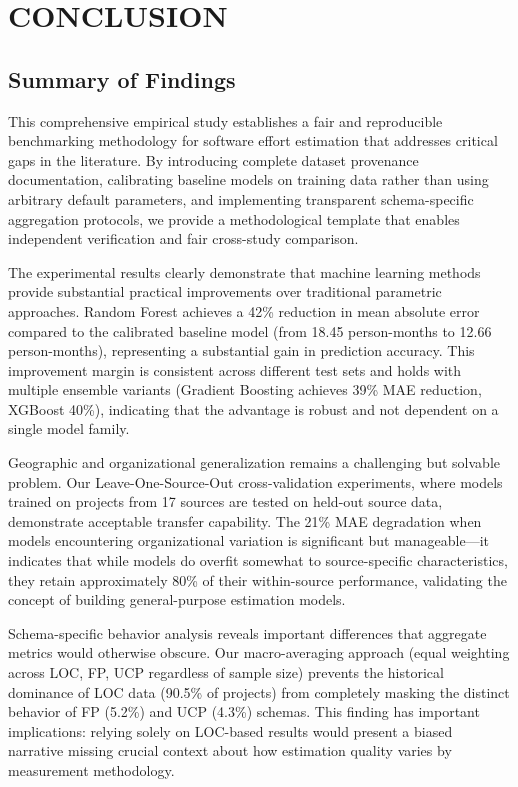 \documentclass[11pt,a4paper]{article}
\begin{document}
\newpage

\section{CONCLUSION}

\subsection{Summary of Findings}

This comprehensive empirical study establishes a fair and reproducible benchmarking methodology for software effort estimation that addresses critical gaps in the literature. By introducing complete dataset provenance documentation, calibrating baseline models on training data rather than using arbitrary default parameters, and implementing transparent schema-specific aggregation protocols, we provide a methodological template that enables independent verification and fair cross-study comparison.

The experimental results clearly demonstrate that machine learning methods provide substantial practical improvements over traditional parametric approaches. Random Forest achieves a 42\% reduction in mean absolute error compared to the calibrated baseline model (from 18.45 person-months to 12.66 person-months), representing a substantial gain in prediction accuracy. This improvement margin is consistent across different test sets and holds with multiple ensemble variants (Gradient Boosting achieves 39\% MAE reduction, XGBoost 40\%), indicating that the advantage is robust and not dependent on a single model family.

Geographic and organizational generalization remains a challenging but solvable problem. Our Leave-One-Source-Out cross-validation experiments, where models trained on projects from 17 sources are tested on held-out source data, demonstrate acceptable transfer capability. The 21\% MAE degradation when models encountering organizational variation is significant but manageable---it indicates that while models do overfit somewhat to source-specific characteristics, they retain approximately 80\% of their within-source performance, validating the concept of building general-purpose estimation models.

Schema-specific behavior analysis reveals important differences that aggregate metrics would otherwise obscure. Our macro-averaging approach (equal weighting across LOC, FP, UCP regardless of sample size) prevents the historical dominance of LOC data (90.5\% of projects) from completely masking the distinct behavior of FP (5.2\%) and UCP (4.3\%) schemas. This finding has important implications: relying solely on LOC-based results would present a biased narrative missing crucial context about how estimation quality varies by measurement methodology.
\end{document}
